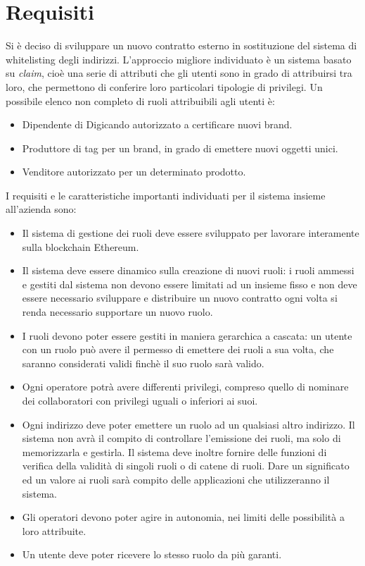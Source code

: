 \section{Requisiti}
\label{requisiti}
Si è deciso di sviluppare un nuovo contratto esterno in sostituzione del sistema di whitelisting degli indirizzi. L'approccio migliore individuato è un sistema basato su \emph{claim}, cioè una serie di attributi che gli utenti sono in grado di attribuirsi tra loro, che permettono di conferire loro particolari tipologie di privilegi. Un possibile elenco non completo di ruoli attribuibili agli utenti è:
\begin{itemize}
    \item Dipendente di Digicando autorizzato a certificare nuovi brand.
    \item Produttore di tag per un brand, in grado di emettere nuovi oggetti unici.
    \item Venditore autorizzato per un determinato prodotto.
\end{itemize}

\noindent
I requisiti e le caratteristiche importanti individuati per il sistema insieme all'azienda sono:
\begin{itemize}
    \item Il sistema di gestione dei ruoli deve essere sviluppato per lavorare interamente sulla blockchain Ethereum.
    \item Il sistema deve essere dinamico sulla creazione di nuovi ruoli: i ruoli ammessi e gestiti dal sistema non devono essere limitati ad un insieme fisso e non deve essere necessario sviluppare e distribuire un nuovo contratto ogni volta si renda necessario supportare un nuovo ruolo.
    \item I ruoli devono poter essere gestiti in maniera gerarchica a cascata: un utente con un ruolo può avere il permesso di emettere dei ruoli a sua volta, che saranno considerati validi finchè il suo ruolo sarà valido.
    \item Ogni operatore potrà avere differenti privilegi, compreso quello di nominare dei collaboratori con privilegi uguali o inferiori ai suoi.
    \item Ogni indirizzo deve poter emettere un ruolo ad un qualsiasi altro indirizzo. Il sistema non avrà il compito di controllare l'emissione dei ruoli, ma solo di memorizzarla e gestirla. Il sistema deve inoltre fornire delle funzioni di verifica della validità di singoli ruoli o di catene di ruoli. Dare un significato ed un valore ai ruoli sarà compito delle applicazioni che utilizzeranno il sistema.
    \item Gli operatori devono poter agire in autonomia, nei limiti delle possibilità a loro attribuite.
    \item Un utente deve poter ricevere lo stesso ruolo da più garanti.
\end{itemize}
